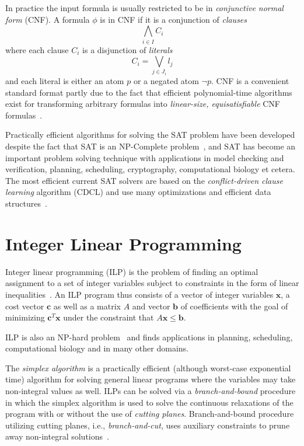 \documentclass[12pt,a4paper]{article}
\begin{document}
In practice the input formula is usually restricted to be in \emph{conjunctive normal form} (CNF).
A formula $\phi$ is in CNF if it is a conjunction of \emph{clauses}
$$ \bigwedge_{i\in I} C_i $$
where each clause $C_i$ is a disjunction of \emph{literals}
$$ C_i = \bigvee_{j\in J_i} l_j $$
and each literal is either an atom $p$ or a negated atom $\neg p$.
CNF is a convenient standard format partly due to the fact that efficient polynomial-time algorithms exist for transforming arbitrary formulas into \emph{linear-size, equisatisfiable} CNF formulas~\cite{tseitin1983, DBLP:journals/jsc/PlaistedG86}.

Practically efficient algorithms for solving the SAT problem have been developed despite the fact that SAT is an NP-Complete problem~\cite{DBLP:conf/stoc/Cook71}, 
and SAT has become an important problem solving technique with applications in model checking and verification, planning, scheduling, cryptography, computational biology et cetera.
The most efficient current SAT solvers are based on the \emph{conflict-driven clause learning} algorithm (CDCL) and use many optimizations and efficient data structures~\cite{DBLP:conf/iccad/SilvaS96, DBLP:journals/tc/Marques-SilvaS99, DBLP:conf/dac/MoskewiczMZZM01, DBLP:conf/aaai/GomesSK98, DBLP:journals/dam/GoldbergN07, ryan2004efficient, DBLP:conf/aaai/BayardoS97, DBLP:conf/sat/LewisSB05}.


\section{Integer Linear Programming}
\label{sec:ilp}
Integer linear programming (ILP) is the problem of finding an optimal assignment to a set of integer variables subject to constraints in the form of linear inequalities~\cite{DBLP:books/ph/PapadimitriouS82}.
An ILP program thus consists of a vector of integer variables $\mathbf{x}$, a cost vector $\mathbf{c}$ as well as a matrix $A$ and vector $\mathbf{b}$ of coefficients with the goal of minimizing $\mathbf{c}^T \mathbf{x}$ under the constraint that $A\mathbf{x} \leq \mathbf{b}$.

ILP is also an NP-hard problem~\cite{DBLP:conf/coco/Karp72} and finds applications in planning, scheduling, computational biology and in many other domains.

The \emph{simplex algorithm} is a practically efficient (although worst-case exponential time) algorithm for solving general linear programs where the variables may take non-integral values as well.
ILPs can be solved via a \emph{branch-and-bound} procedure in which the simplex algorithm is used to solve the continuous relaxations of the program with or without the use of \emph{cutting planes}.
Branch-and-bound procedure utilizing cutting planes, i.e., \emph{branch-and-cut}, uses auxiliary constraints to prune away non-integral solutions~\cite{DBLP:books/ph/PapadimitriouS82}.
\end{document}

